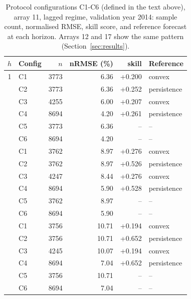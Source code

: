 \begin{table}[t]
  \centering
  \small
  \caption{Protocol configurations C1-C6 (defined in the text above),
  array 11, lagged regime, validation year 2014: sample count,
  normalised RMSE, skill score, and reference forecast at each
  horizon. Arrays 12 and 17 show the same pattern
  (Section~\ref{sec:results}).}
  \label{tab:T2}
  \begin{tabular}{cl rrrl}
    \toprule
    $h$ & Config & $n$ & nRMSE (\%) & skill & Reference \\
    \midrule
    1 & C1 & 3773 & 6.36 & +0.200 & convex \\
     & C2 & 3773 & 6.36 & +0.252 & persistence \\
     & C3 & 4255 & 6.00 & +0.207 & convex \\
     & C4 & 8694 & 4.20 & +0.261 & persistence \\
     & C5 & 3773 & 6.36 & -- & -- \\
     & C6 & 8694 & 4.20 & -- & -- \\
    \addlinespace
    3 & C1 & 3762 & 8.97 & +0.276 & convex \\
     & C2 & 3762 & 8.97 & +0.526 & persistence \\
     & C3 & 4247 & 8.44 & +0.276 & convex \\
     & C4 & 8694 & 5.90 & +0.528 & persistence \\
     & C5 & 3762 & 8.97 & -- & -- \\
     & C6 & 8694 & 5.90 & -- & -- \\
    \addlinespace
    6 & C1 & 3756 & 10.71 & +0.194 & convex \\
     & C2 & 3756 & 10.71 & +0.652 & persistence \\
     & C3 & 4245 & 10.07 & +0.194 & convex \\
     & C4 & 8694 & 7.04 & +0.652 & persistence \\
     & C5 & 3756 & 10.71 & -- & -- \\
     & C6 & 8694 & 7.04 & -- & -- \\
    \bottomrule
  \end{tabular}
\end{table}
